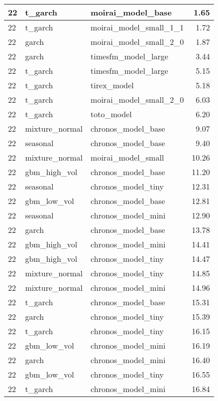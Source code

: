 {\begin{tabular}{lllr}
\midrule
22 & t\_garch & moirai\_model\_base & 1.65 \\
\midrule
22 & t\_garch & moirai\_model\_small\_1\_1 & 1.72 \\
\midrule
22 & garch & moirai\_model\_small\_2\_0 & 1.87 \\
\midrule
22 & garch & timesfm\_model\_large & 3.44 \\
\midrule
22 & t\_garch & timesfm\_model\_large & 5.15 \\
\midrule
22 & t\_garch & tirex\_model & 5.18 \\
\midrule
22 & t\_garch & moirai\_model\_small\_2\_0 & 6.03 \\
\midrule
22 & t\_garch & toto\_model & 6.20 \\
\midrule
22 & mixture\_normal & chronos\_model\_base & 9.07 \\
\midrule
22 & seasonal & chronos\_model\_base & 9.40 \\
\midrule
22 & mixture\_normal & moirai\_model\_small & 10.26 \\
\midrule
22 & gbm\_high\_vol & chronos\_model\_base & 11.20 \\
\midrule
22 & seasonal & chronos\_model\_tiny & 12.31 \\
\midrule
22 & gbm\_low\_vol & chronos\_model\_base & 12.81 \\
\midrule
22 & seasonal & chronos\_model\_mini & 12.90 \\
\midrule
22 & garch & chronos\_model\_base & 13.78 \\
\midrule
22 & gbm\_high\_vol & chronos\_model\_mini & 14.41 \\
\midrule
22 & gbm\_high\_vol & chronos\_model\_tiny & 14.47 \\
\midrule
22 & mixture\_normal & chronos\_model\_tiny & 14.85 \\
\midrule
22 & mixture\_normal & chronos\_model\_mini & 14.96 \\
\midrule
22 & t\_garch & chronos\_model\_base & 15.31 \\
\midrule
22 & garch & chronos\_model\_tiny & 15.39 \\
\midrule
22 & t\_garch & chronos\_model\_tiny & 16.15 \\
\midrule
22 & gbm\_low\_vol & chronos\_model\_mini & 16.19 \\
\midrule
22 & garch & chronos\_model\_mini & 16.40 \\
\midrule
22 & gbm\_low\_vol & chronos\_model\_tiny & 16.55 \\
\midrule
22 & t\_garch & chronos\_model\_mini & 16.84 \\
\bottomrule
\end{tabular}
}